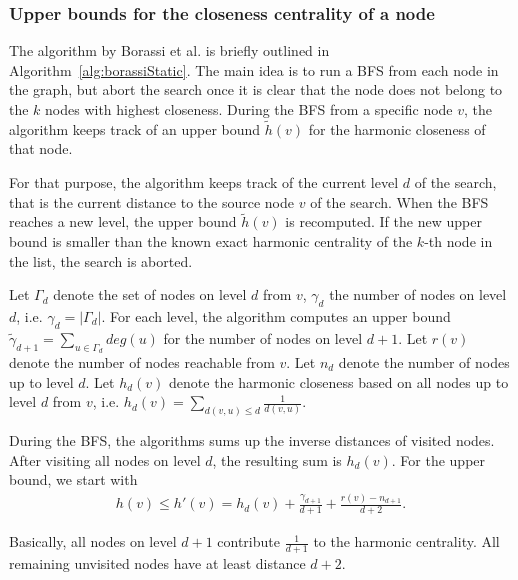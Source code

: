 \subsubsection{Upper bounds for the closeness centrality of a node}
\label{sec:borassiUpperBound}
The algorithm by Borassi et al. is briefly outlined in Algorithm~\ref{alg:borassiStatic}. The main idea is to run a BFS from each node in the graph, but abort the search once it is clear that the node does not belong to the $k$ nodes with highest closeness. During the BFS from a specific node $v$, the algorithm keeps track of an upper bound $\widetilde{h}(v)$ for the harmonic closeness of that node.

For that purpose, the algorithm keeps track of the current level $d$ of the search, that is the current distance to the source node $v$ of the search. When the BFS reaches a new level, the upper bound $\widetilde{h}(v)$ is recomputed. If the new upper bound is smaller than the known exact harmonic centrality of the $k$-th node in the list, the search is aborted. 

Let $\Gamma_d$ denote the set of nodes on level $d$ from $v$, $\gamma_d$ the number of nodes on level $d$, i.e. $\gamma_d = |\Gamma_d|$. For each level, the algorithm computes an upper bound $\widetilde{\gamma}_{d+1} = \sum_{u \in \Gamma_d}{deg(u)}$ for the number of nodes on level $d + 1$. Let $r(v)$ denote the number of nodes reachable from $v$. Let $n_d$ denote the number of nodes up to level $d$. Let $h_d(v)$ denote the harmonic closeness based on all nodes up to level $d$ from $v$, i.e. $h_d(v) = \sum_{d(v, u) \leq d}{\frac{1}{d(v, u)}}$.

During the BFS, the algorithms sums up the inverse distances of visited nodes. After visiting all nodes on level $d$, the resulting sum is $h_d(v)$. For the upper bound, we start with
\begin{align}
	h(v) \leq h'(v) = h_d(v) + \frac{\gamma_{d+1}}{d+1} + \frac{r(v) - n_{d+1}}{d+2}.
\end{align}

Basically, all nodes on level $d + 1$ contribute $\frac{1}{d+1}$ to the harmonic centrality. All remaining unvisited nodes have at least distance $d + 2$.

